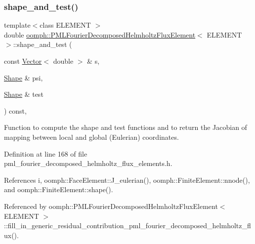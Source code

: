 \mbox{\label{classoomph_1_1PMLFourierDecomposedHelmholtzFluxElement_a8c440496f9b1b68b057bd2a443ad4005}} 
\subsubsection{\texorpdfstring{shape\+\_\+and\+\_\+test()}{shape\_and\_test()}}
{\footnotesize\ttfamily template$<$class E\+L\+E\+M\+E\+NT $>$ \\
double \hyperlink{classoomph_1_1PMLFourierDecomposedHelmholtzFluxElement}{oomph\+::\+P\+M\+L\+Fourier\+Decomposed\+Helmholtz\+Flux\+Element}$<$ E\+L\+E\+M\+E\+NT $>$\+::shape\+\_\+and\+\_\+test (\begin{DoxyParamCaption}\item[{const \hyperlink{classoomph_1_1Vector}{Vector}$<$ double $>$ \&}]{s,  }\item[{\hyperlink{classoomph_1_1Shape}{Shape} \&}]{psi,  }\item[{\hyperlink{classoomph_1_1Shape}{Shape} \&}]{test }\end{DoxyParamCaption}) const\hspace{0.3cm}{\ttfamily [inline]}, {\ttfamily [protected]}}



Function to compute the shape and test functions and to return the Jacobian of mapping between local and global (Eulerian) coordinates. 



Definition at line 168 of file pml\+\_\+fourier\+\_\+decomposed\+\_\+helmholtz\+\_\+flux\+\_\+elements.\+h.



References i, oomph\+::\+Face\+Element\+::\+J\+\_\+eulerian(), oomph\+::\+Finite\+Element\+::nnode(), and oomph\+::\+Finite\+Element\+::shape().



Referenced by oomph\+::\+P\+M\+L\+Fourier\+Decomposed\+Helmholtz\+Flux\+Element$<$ E\+L\+E\+M\+E\+N\+T $>$\+::fill\+\_\+in\+\_\+generic\+\_\+residual\+\_\+contribution\+\_\+pml\+\_\+fourier\+\_\+decomposed\+\_\+helmholtz\+\_\+flux().

